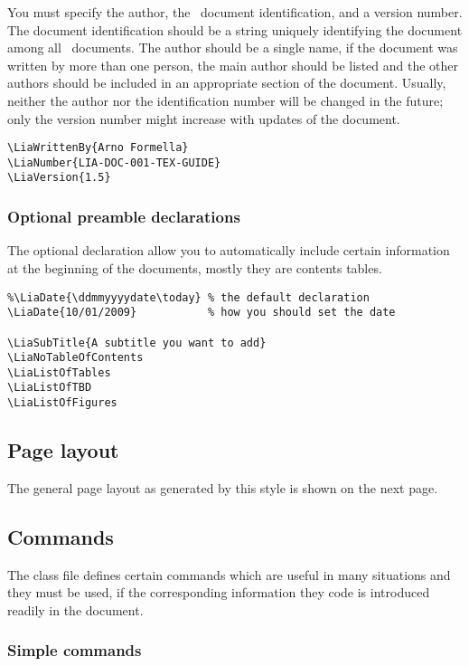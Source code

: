 \documentclass{lia}
\begin{document}
You must specify the author, the \Lia\ document identification, and
a version number.
The document identification should be a string uniquely identifying
the document among all \Lia\ documents.
The author should be a single name, if the document was written
by more than one person, the main author should be listed and the
other authors should be included in an appropriate section of the
document.
Usually, neither the author nor the identification number will be
changed in the future;
only the version number might increase with updates of the document.

\begin{verbatim}
\LiaWrittenBy{Arno Formella}
\LiaNumber{LIA-DOC-001-TEX-GUIDE}
\LiaVersion{1.5}
\end{verbatim}

\subsubsection{Optional preamble declarations}

The optional declaration allow you to automatically include certain
information at the beginning of the documents, mostly they are
contents tables.

\begin{verbatim}
%\LiaDate{\ddmmyyyydate\today} % the default declaration
\LiaDate{10/01/2009}           % how you should set the date

\LiaSubTitle{A subtitle you want to add}
\LiaNoTableOfContents
\LiaListOfTables
\LiaListOfTBD
\LiaListOfFigures
\end{verbatim}

\subsection{Page layout}

The general page layout as generated by this style is shown on the next page.

\pagebreak
\layout

\pagebreak
\subsection{Commands}

The class file defines certain commands which are useful in many
situations and they must be used, if the corresponding information
they code is introduced readily in the document.

\subsubsection{Simple commands}
\end{document}
